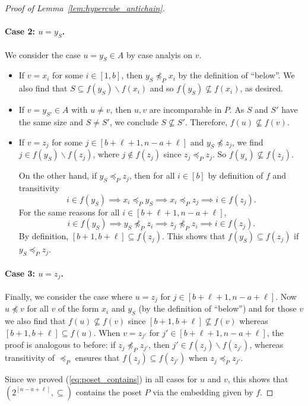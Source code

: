 \documentclass[11pt]{article}
\newcommand{\1}{\mathbbm{1}}
\let\setminus=\smallsetminus
\def\cleq{\preccurlyeq}
\begin{document}
\begin{proof}[Proof of Lemma~\ref{lem:hypercube_antichain}]
\paragraph{Case 2: $u = y_S$.} 
We consider the case $u=y_S\in A$ by case analyis on $v$.
\begin{itemize}
    \item If $v=x_i$ for some $i\in [1,b]$, then $y_S\not\cleq_P x_i$ by the definition of ``below''. We also find that $S\subseteq f(y_S)\setminus f(x_i)$ and so $f(y_S)\not\subseteq f(x_i)$, as desired.
    \item If $v=y_{S'}\in A$ with $u\neq v$, then $u,v$ are incomparable in $P$. As $S$ and $S'$ have the same size and $S \neq S'$, we conclude $S \not \subseteq S'$. Therefore, $f(u) \not \subseteq f(v)$.
    
    \item If $v=z_j$ for some $j\in [b+\ell+1, n - a + \ell]$ and $y_S\not\cleq z_j$, we find $j\in f(y_S)\setminus f(z_j)$, where $j \not \in f(z_j)$ since $z_j \cleq_P z_j$. So $f(y_s)\not \subseteq f(z_j)$. 
    
    On the other hand, if $y_S\cleq_P z_j$, then for all $i\in [b]$ by definition of $f$ and transitivity \[
    i\in f(y_S)\implies 
    x_i\cleq_P y_S\implies x_i\cleq_P z_j \implies i\in f(z_j).
    \]
    For the same reasons for all $i\in [b+\ell+1,n-a+\ell]$,
    \[
    i\in f(y_S)\implies y_S\not\cleq_P z_i\implies z_j \not\cleq_P z_i\implies i\in f(z_j).
    \]
    By definition, $[b+1,b+\ell]\subseteq f(z_j)$. This shows that $f(y_S)\subseteq f(z_j)$ if $y_S\cleq_P z_j$.
\end{itemize}

\paragraph{Case 3: $u = z_j$.} Finally, we consider the case where $u=z_j$ for $j\in [b+\ell+1,n-a+\ell]$. Now $u\not\cleq v$ for all $v$ of the form $x_i$ and $y_S$ (by the definition of ``below'') and for those $v$ we also find that $f(u)\not\subseteq f(v)$ since $[b+1,b+\ell]\not\subseteq f(v)$ whereas $[b+1,b+\ell]\subseteq f(u)$. 
When $v=z_{j'}$ for $j'\in [b+\ell+1,n-a+\ell]$, the proof is analogous to before: if $z_j\not\cleq_P z_{j'}$, then $j'\in f(z_{j})\setminus f(z_{j'})$, whereas transitivity of $\cleq_P$ ensures that $f(z_j)\subseteq f(z_{j'})$ when $z_j\cleq_P z_{j'}$.

Since we proved (\ref{eq:poset_contains}) in all cases for $u$ and $v$, this shows that $(2^{[n-a+\ell]},\subseteq )$ contains the poset $P$ via the embedding given by $f$.
\end{proof}
\end{document}
